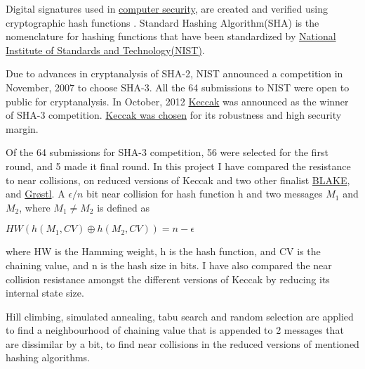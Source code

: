 \begin{abstractpage}

Digital signatures used in \href{"http://en.wikipedia.org/wiki/Cryptographic\_hash\_function\#Applications"}
{computer security}, are created and verified using cryptographic hash functions \cite{00042}.
Standard Hashing Algorithm(SHA) is the nomenclature for hashing functions that have been standardized
by \href{"http://www.nist.gov/index.html"}{National Institute of Standards and Technology(NIST)}.

Due to advances in cryptanalysis of SHA-2, NIST announced a competition in November, 2007 to choose SHA-3. 
All the 64 submissions to NIST were open to public for cryptanalysis. 
In October, 2012 \href{"http://keccak.noekeon.org/"}{Keccak} was announced as the winner of SHA-3 competition. 
\href{"http://csrc.nist.gov/groups/ST/hash/sha-3/sha-3\_selection\_announcement.pdf"}{Keccak was chosen}
for its robustness and high security margin.

Of the 64 submissions for SHA-3 competition, 56 were selected for the first round, and 5 made it final round.
In this project I have compared the resistance to near collisions, on reduced versions of Keccak and two other
finalist \href{"https://131002.net/blake/"}{BLAKE}, and \href{"http://www.groestl.info/"}{Gr{\o}stl}. 
A $\epsilon / n $ bit near collision for hash function h and two messages $M_{1}$ and $M_{2}$, where
$M_{1} \neq M_{2}$ is defined as
\begin{center}$HW( h( M_{1}, CV ) \oplus h( M_{2}, CV ) ) = n - \epsilon $\end{center}
where HW is the Hamming weight, h is the hash function, and CV is the chaining value, and n is the hash size 
in bits. I have also compared the near collision resistance amongst the different versions of Keccak by 
reducing its internal state size.

Hill climbing, simulated annealing, tabu search and random selection are applied to find a neighbourhood of chaining
value that is appended to 2 messages that are dissimilar by a bit, to find near collisions in the reduced versions of
mentioned hashing algorithms.
  
\end{abstractpage}
